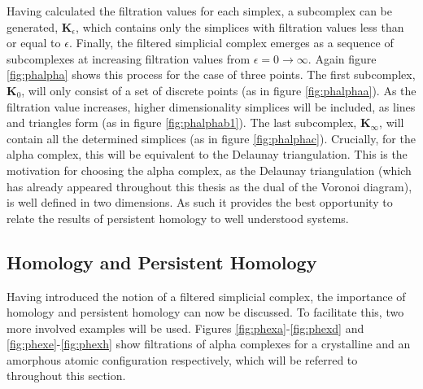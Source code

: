 Having calculated the filtration values for each simplex, a subcomplex can be generated, $\mathbf{K}_\epsilon$, which contains only the simplices with filtration values less than or equal to $\epsilon$.
Finally, the filtered simplicial complex emerges as a sequence of subcomplexes at increasing filtration values from $\epsilon=0\rightarrow \infty$.
Again figure \ref{fig:phalpha} shows this process for the case of three points.
The first subcomplex, $\mathbf{K}_0$, will only consist of a set of discrete points (as in figure \ref{fig:phalphaa}).
As the filtration value increases, higher dimensionality simplices will be included, as lines and triangles form (as in figure \ref{fig:phalphab1}).
The last subcomplex, $\mathbf{K}_\infty$, will contain all the determined simplices (as in figure \ref{fig:phalphac}).
Crucially, for the alpha complex, this will be equivalent to the Delaunay triangulation.
This is the motivation for choosing the alpha complex, as the Delaunay triangulation (which has already appeared throughout this thesis as the dual of the Voronoi diagram), is well defined in two dimensions. 
As such it provides the best opportunity to relate the results of persistent homology to well understood systems.

\subsection{Homology and Persistent Homology}

Having introduced the notion of a filtered simplicial complex, the importance of homology and persistent homology can now be discussed.
To facilitate this, two more involved examples will be used.
Figures \ref{fig:phexa}\--\ref{fig:phexd} and \ref{fig:phexe}\--\ref{fig:phexh} show filtrations of alpha complexes for a crystalline and an amorphous atomic configuration respectively, which will be referred to throughout this section.

